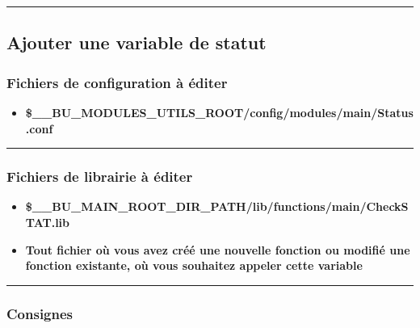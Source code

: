 \documentclass[a4paper,10pt]{article}
\begin{document}

\color{green}\par\noindent\rule{\textwidth}{0.4pt}\color{white}

\color{green}
\subsection{Ajouter une variable de statut}\color{white}

\color{blue}
\subsubsection{Fichiers de configuration à éditer}\color{white}

\begin{itemize}
    \item \textbf{\color{orange}\$\_\_BU\_MODULES\_UTILS\_ROOT\color{lime}/config/modules/main/Status.conf}\\[1\baselineskip]
\end{itemize}



\color{blue}\par\noindent\rule{\textwidth}{0.4pt}\color{white}

\color{blue}
\subsubsection{Fichiers de librairie à éditer}\color{white}

\begin{justify}
    \begin{itemize}
        \item \textbf{\color{orange}\$\_\_BU\_MAIN\_ROOT\_DIR\_PATH\color{lime}/lib/functions/main/CheckSTAT.lib}\\

        \item \textbf{Tout fichier où vous avez créé une nouvelle fonction ou modifié une fonction existante, où vous souhaitez appeler cette variable}
    \end{itemize}
\end{justify}



\color{blue}\par\noindent\rule{\textwidth}{0.4pt}\color{white}

\color{blue}
\subsubsection{Consignes}\color{white}
\end{document}
